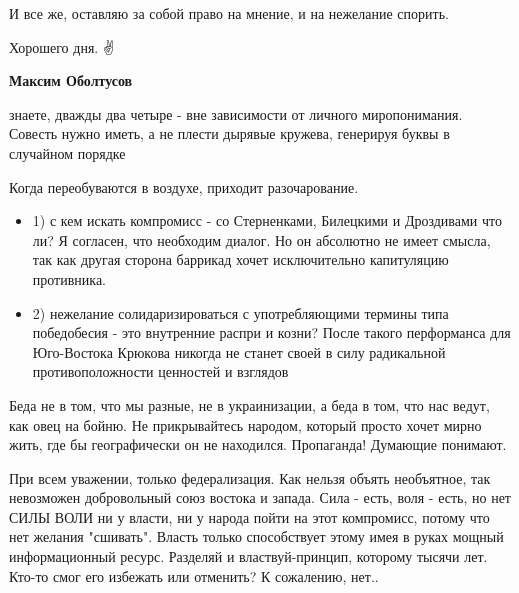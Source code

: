 \begin{itemize}
\begin{itemize}
И все же, оставляю за собой право на мнение, и на нежелание спорить.

Хорошего дня. ✌️

 
\textbf{Максим Оболтусов} 

знаете, дважды два четыре - вне зависимости от личного миропонимания. Совесть
нужно иметь, а не плести дырявые кружева, генерируя буквы в случайном порядке
\end{itemize}


 
Когда переобуваются в воздухе, приходит разочарование.


\begin{itemize}
\item 1) с кем искать компромисс - со Стерненками, Билецкими и Дроздивами что ли? Я
согласен, что необходим диалог. Но он абсолютно не имеет смысла, так как другая
сторона баррикад хочет исключительно капитуляцию противника.

\item 2) нежелание солидаризироваться с употребляющими термины типа победобесия - это
внутренние распри и козни? После такого перформанса для Юго-Востока Крюкова
никогда не станет своей в силу радикальной противоположности ценностей и
взглядов
\end{itemize}


Беда не в том, что мы разные, не в украинизации, а беда в том, что нас ведут,
как овец на бойню. Не прикрывайтесь народом, который просто хочет мирно жить,
где бы географически он не находился. Пропаганда! Думающие понимают.


При всем уважении, только федерализация. Как нельзя объять необъятное, так
невозможен добровольный союз востока и запада. Сила - есть, воля - есть, но нет
СИЛЫ ВОЛИ ни у власти, ни у народа пойти на этот компромисс, потому что нет
желания "сшивать". Власть только способствует этому имея в руках мощный
информационный ресурс. Разделяй и властвуй-принцип, которому тысячи лет. Кто-то
смог его избежать или отменить? К сожалению, нет..


\end{itemize}
